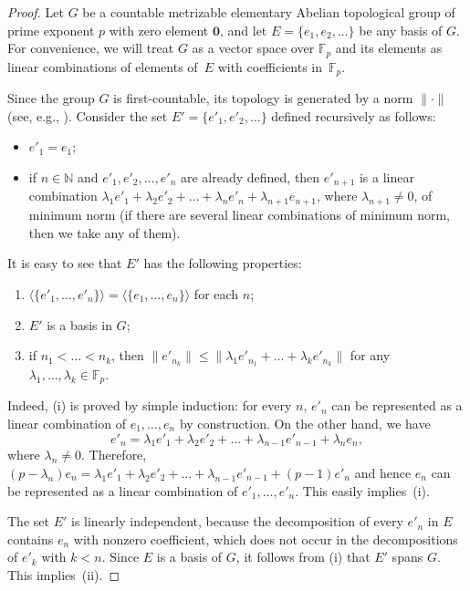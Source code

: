 \documentclass[12pt,a4paper]{amsart}
\theoremstyle{definition}
\newcommand{\zero}{{\mathbf 0}}
\begin{document}
\begin{proof}
Let $G$ be a countable metrizable elementary Abelian topological group of prime exponent $p$ 
with zero element $\zero$, and let $E=\{e_1, e_2, \dots\}$ be any basis of $G$. For convenience, we will treat 
$G$ as a vector space over 
$\mathbb F_p$ and its elements as linear combinations of elements of~$E$ with coefficients in~$\mathbb F_p$. 

Since the group $G$ is first-countable, its topology is generated by a norm $\lVert\boldsymbol\cdot\rVert$ (see, 
e.g., \cite{Graev50}). Consider the set $E'=\{e'_1, e'_2, \dots\}$ defined recursively as follows: 
\begin{itemize} 
\item 
$e'_1= e_1$; 
\item 
if $n\in \mathbb N$ and $e'_1, e'_2, \dots, e'_{n}$ are already defined, then $e'_{n+1}$ is 
a linear combination $\lambda_1 e'_1 +\lambda_2 e'_2 + \dots+ \lambda_n e'_{n}+\lambda_{n+1} 
e_{n+1}$, where $\lambda_{n+1}\ne 0$, of minimum norm (if there are 
several linear combinations of minimum norm, then we take any of them). 
\end{itemize}

It is easy to see that $E'$ has the following properties:
\begin{enumerate}[{\rm(i)}]
\item
$\langle \{e'_1, \dots, e'_n\}\rangle =\langle \{e_1, \dots, e_n\}\rangle$ for each $n$;
\item
$E'$ is a basis in $G$;
\item
if $n_1<\dots <n_k$, then $\|e'_{n_k}\|\le \|\lambda_1 e'_{n_1}+\dots +\lambda_k e'_{n_k}\|$ for any $\lambda_1, 
\dots, \lambda_k\in \mathbb F_p$. 
\end{enumerate} 

Indeed, (i) is proved by simple induction: for every $n$, $e'_n$ can be represented as a linear combination 
of $e_1, \dots, e_n$ by construction. On the other hand, we have 
$$
e'_n=\lambda_1 e'_1+ \lambda_2e'_2+ \dots +\lambda_{n-1}e'_{n-1}+\lambda_n e_n,
$$ 
where $\lambda_n\ne 0$. Therefore, $(p-\lambda_n) e_n= 
\lambda_1 e'_1+ \lambda_2e'_2+ \dots +\lambda_{n-1}e'_{n-1}+(p-1)e'_n$ and hence 
$e_n$ can be represented as a linear combination of $e'_1, \dots, e'_{n}$. This easily implies~(i).

The set $E'$ is linearly independent, because the decomposition of every $e'_n$ in $E$  
contains $e_n$ with nonzero coefficient, which does not occur in the decompositions of $e'_k$ with $k<n$. Since 
$E$ is a basis of $G$, it follows from (i) that $E'$ spans $G$. This implies~(ii).


\end{proof}
\end{document}
